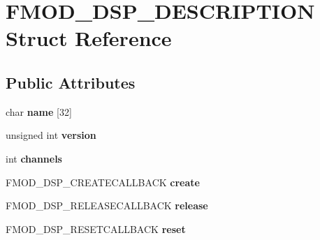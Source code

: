 \hypertarget{struct_f_m_o_d___d_s_p___d_e_s_c_r_i_p_t_i_o_n}{\section{F\-M\-O\-D\-\_\-\-D\-S\-P\-\_\-\-D\-E\-S\-C\-R\-I\-P\-T\-I\-O\-N Struct Reference}
\label{struct_f_m_o_d___d_s_p___d_e_s_c_r_i_p_t_i_o_n}
}
\subsection*{Public Attributes}
\begin{DoxyCompactItemize}
\item 
\hypertarget{struct_f_m_o_d___d_s_p___d_e_s_c_r_i_p_t_i_o_n_a936bbb2616344ea745f21fcb86201497}{char {\bfseries name} \mbox{[}32\mbox{]}}\label{struct_f_m_o_d___d_s_p___d_e_s_c_r_i_p_t_i_o_n_a936bbb2616344ea745f21fcb86201497}

\item 
\hypertarget{struct_f_m_o_d___d_s_p___d_e_s_c_r_i_p_t_i_o_n_a2b39be891bd32c184883a673348bd29a}{unsigned int {\bfseries version}}\label{struct_f_m_o_d___d_s_p___d_e_s_c_r_i_p_t_i_o_n_a2b39be891bd32c184883a673348bd29a}

\item 
\hypertarget{struct_f_m_o_d___d_s_p___d_e_s_c_r_i_p_t_i_o_n_a6d8bbb62ed1b5bd7a5a90b6e3687360d}{int {\bfseries channels}}\label{struct_f_m_o_d___d_s_p___d_e_s_c_r_i_p_t_i_o_n_a6d8bbb62ed1b5bd7a5a90b6e3687360d}

\item 
\hypertarget{struct_f_m_o_d___d_s_p___d_e_s_c_r_i_p_t_i_o_n_ab5425909d6162252d06da751ffc971ed}{F\-M\-O\-D\-\_\-\-D\-S\-P\-\_\-\-C\-R\-E\-A\-T\-E\-C\-A\-L\-L\-B\-A\-C\-K {\bfseries create}}\label{struct_f_m_o_d___d_s_p___d_e_s_c_r_i_p_t_i_o_n_ab5425909d6162252d06da751ffc971ed}

\item 
\hypertarget{struct_f_m_o_d___d_s_p___d_e_s_c_r_i_p_t_i_o_n_a39af498cf54ff7d6f7dd8ffbaaf238d7}{F\-M\-O\-D\-\_\-\-D\-S\-P\-\_\-\-R\-E\-L\-E\-A\-S\-E\-C\-A\-L\-L\-B\-A\-C\-K {\bfseries release}}\label{struct_f_m_o_d___d_s_p___d_e_s_c_r_i_p_t_i_o_n_a39af498cf54ff7d6f7dd8ffbaaf238d7}

\item 
\hypertarget{struct_f_m_o_d___d_s_p___d_e_s_c_r_i_p_t_i_o_n_a837aca99489149f6eb46cfa4da0a03c9}{F\-M\-O\-D\-\_\-\-D\-S\-P\-\_\-\-R\-E\-S\-E\-T\-C\-A\-L\-L\-B\-A\-C\-K {\bfseries reset}}\label{struct_f_m_o_d___d_s_p___d_e_s_c_r_i_p_t_i_o_n_a837aca99489149f6eb46cfa4da0a03c9}


\end{DoxyCompactItemize}
